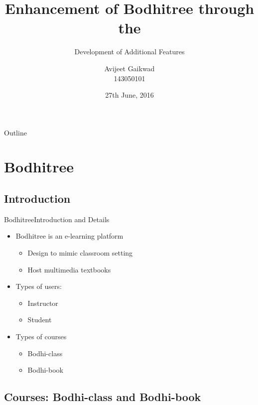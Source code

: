 \documentclass[xcolor=table]{beamer}
\title[Feature addition to Bodhitree]{Enhancement of Bodhitree through the}
\subtitle{Development of Additional Features}
\author{Avijeet Gaikwad \\ 143050101}
\institute[] %
{  Guided by \\
	\vspace{0.1cm}
	{\small Prof. Kameswari Chebrolu} \\
	\vspace{0.5cm}
	Department of Computer Science and Engineering\\
	IIT Bombay
}
\date{27th June, 2016}
\begin{document}
\begin{frame}
  \titlepage
\end{frame}

\begin{frame}{Outline}
  \begin{multicols}{2}
    \tableofcontents
  \end{multicols}
\end{frame}

\section{Bodhitree}

\subsection{Introduction}

\begin{frame}{Bodhitree}{Introduction and Details}
  \begin{itemize}
  \item {
    Bodhitree is an e-learning platform
    \begin{itemize}
    	\item Design to mimic classroom setting
    	\item Host multimedia textbooks
    \end{itemize}
  }
  \item {
    Types of users:
    \begin{itemize}
    	\item Instructor
    	\item Student
    \end{itemize}
  }
  \item {
  	Types of courses
	\begin{itemize}
		\item Bodhi-class
		\item Bodhi-book
	\end{itemize}
  }
\end{itemize}
\end{frame}

\subsection{Courses: Bodhi-class and Bodhi-book}
\end{document}
